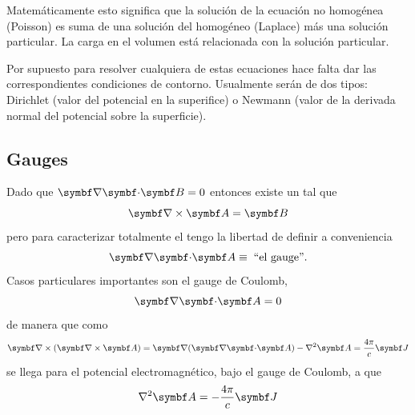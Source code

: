 \documentclass[10pt,oneside]{CBFT_book}
\begin{document}
Matemáticamente esto significa que la solución de la ecuación no homogénea (Poisson) es suma de 
una solución del homogéneo (Laplace) más una solución particular. 
La carga en el volumen está relacionada con la solución particular.

Por supuesto para resolver cualquiera de estas ecuaciones hace falta dar las correspondientes
condiciones de contorno. Usualmente serán de dos tipos: Dirichlet (valor del potencial en la
superifice) o Newmann (valor de la derivada normal del potencial sobre la superficie).

\subsection{Gauges}

Dado que $\divem{B}=0$ entonces existe un  tal que 
\[
	\rotorm{A} = \vb{B}
\]
pero para caracterizar totalmente el  tengo la libertad de definir a conveniencia
\[
	\divem{A} \equiv \; \textrm{``el gauge''}.
\]
Casos particulares importantes son el gauge de Coulomb,
\[
	\divem{A} = 0
\]
de manera que como 
\[
	\Nabla \times (\rotorm{A}) = \Nabla(\divem{A}) - \lapm{\vb{A}} = \frac{4\pi}{c}\vb{J}
\]
se llega para el potencial electromagnético, bajo el gauge de Coulomb, a que 
\[
	\lapm{\vb{A}} = - \frac{4\pi}{c}\vb{J} 
\]
\end{document}
